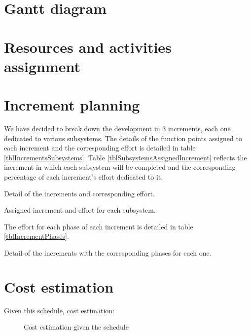 

\section{Gantt diagram}

\section{Resources and activities assignment}

\section{Increment planning}

We have decided to break down the development in 3 increments, each one dedicated to various subsystems. The details of the function points assigned to each increment and the corresponding effort is detailed in table \ref{tblIncrementsSubsystems}. Table \ref{tblSubsystemsAssignedIncrement} reflects the increment in which each subsystem will be completed and the corresponding percentage of each increment's effort dedicated to it.

\begin{table}[hbtp]
\centering

\caption{Detail of the increments and corresponding effort.}
\label{tblIncrementsSubsystems}
\end{table}

\begin{table}[hbtp]
\centering

\caption{Assigned increment and effort for each subsystem.}
\label{tblSubsystemsAssignedIncrement}
\end{table}

The effort for each phase of each increment is detailed in table \ref{tblIncrementPhases}.

\begin{table}[hbtp]
\centering

\caption{Detail of the increments with the corresponding phases for each one.}
\label{tblIncrementPhases}
\end{table}

\section{Cost estimation}

Given this schedule, cost estimation:

\begin{figure}[hbtp]
\centering

\caption{Cost estimation given the schedule}
\label{tblCostResourceEstimate}
\end{figure}
